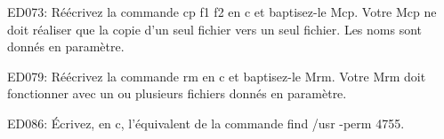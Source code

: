 \begin{list}{+}{}
\item ED073:
Réécrivez la commande cp f1 f2 en c et baptisez-le Mcp. Votre Mcp ne doit réaliser que la copie d'un seul fichier vers un seul fichier. Les noms sont donnés en paramètre.

\item ED079:
Réécrivez la commande rm en c et baptisez-le Mrm. Votre Mrm doit fonctionner avec un ou plusieurs fichiers donnés en paramètre. 

\item ED086:
Écrivez, en c, l'équivalent de la commande find /usr -perm 4755.

\end{list}


